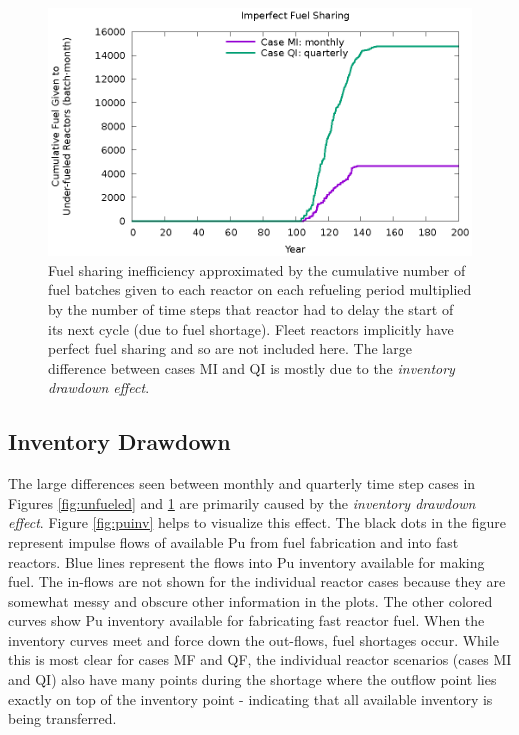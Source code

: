 \documentclass{style}
\begin{document}
\begin{figure}[!h]
    \centering
    \includegraphics[width=1.0\columnwidth]{exp2/badshare.eps}
    \caption[Cumulative unnecessary idling fuel]{
        Fuel sharing inefficiency approximated by the cumulative number of
        fuel batches given to each reactor on each refueling period multiplied
        by the number of time steps that reactor had to delay the start of its
        next cycle (due to fuel shortage).  Fleet reactors implicitly have perfect fuel
        sharing and so are not included here. The large difference
        between cases MI and QI is mostly due to the \emph{inventory drawdown
        effect}. 
    }
    \label{fig:badshare}
\end{figure}

\subsection{Inventory Drawdown}

The large differences seen between monthly and quarterly time step cases in
Figures \ref{fig:unfueled} and \ref{fig:badshare} are primarily caused by the
\emph{inventory drawdown effect}.  Figure \ref{fig:puinv} helps to visualize
this effect.  The black dots in the figure represent impulse flows of
available Pu from fuel fabrication and into fast reactors.  Blue lines represent
the flows into Pu inventory available for making fuel. The in-flows are not
shown for the individual reactor cases because they are somewhat messy and
obscure other information in the plots. The other colored curves show Pu inventory
available for fabricating fast reactor fuel.  When the inventory curves meet and
force down the out-flows, fuel shortages occur.  While this is most clear for
cases MF and QF, the individual reactor scenarios (cases MI and QI) also have many
points during the shortage where the outflow point lies exactly on top of the
inventory point - indicating that all available inventory is being
transferred.
\end{document}
